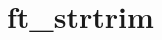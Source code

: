 \chapter{ft\+\_\+strtrim}
\hypertarget{md_Documentation_2ft__strtrim}{}\label{md_Documentation_2ft__strtrim}
